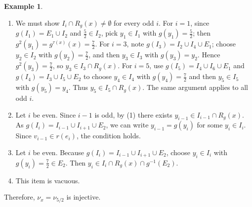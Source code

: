 \documentclass[12pt, reqno]{amsart}
\theoremstyle{definition}
\newtheorem{example}[theorem]{Example}
\theoremstyle{remark}
\numberwithin{equation}{section}
\newcommand{\G}{\mathcal{G}}
\begin{document}
\begin{example}
\begin{enumerate}
  \item We must show $I_i\cap R_g(x)\neq\emptyset$ for every odd $i$.
        For $i=1$, since $g(I_1)=E_1\cup I_2$ and $\tfrac{5}{2}\in I_2$,
        pick $y_1\in I_1$ with $g(y_1)=\tfrac{5}{2}$; then
        $g^2(y_1)=g^{\tau(x)}(x)=\tfrac{7}{2}$.  
        For $i=3$, note $g(I_3)=I_2\cup I_4\cup E_1$; choose
        $y_2\in I_2$ with $g(y_2)=\tfrac{7}{2}$, and then $y_3\in I_3$
        with $g(y_3)=y_2$. Hence $g^2(y_3)=\tfrac{7}{2}$, so
        $y_3\in I_3\cap R_g(x)$.  
        For $i=5$, use $g(I_5)=I_4\cup I_6\cup E_1$ and
        $g(I_4)=I_3\cup I_5\cup E_2$ to choose $y_4\in I_4$ with
        $g(y_4)=\tfrac{7}{2}$ and then $y_5\in I_5$ with $g(y_5)=y_4$.
        Thus $y_5\in I_5\cap R_g(x)$. The same argument applies to all odd $i$.
  \item Let $i$ be even. Since $i-1$ is odd, by (1) there exists
        $y_{i-1}\in I_{i-1}\cap R_g(x)$. As $g(I_i)=I_{i-1}\cup I_{i+1}\cup E_2$,
        we can write $y_{i-1}=g(y_i)$ for some $y_i\in I_i$. Since
        $v_{i-1}\in r(e_i)$, the condition holds.
  \item Let $i$ be even. Because $g(I_i)=I_{i-1}\cup I_{i+1}\cup E_2$, choose
        $y_i\in I_i$ with $g(y_i)=\tfrac{7}{2}\in E_2$. Then
        $y_i\in I_i\cap R_g(x)\cap g^{-1}(E_2)$.
  \item This item is vacuous.
\end{enumerate}
Therefore, $\nu_x=\nu_{5/2}$ is injective.
\end{example}








\end{document}
